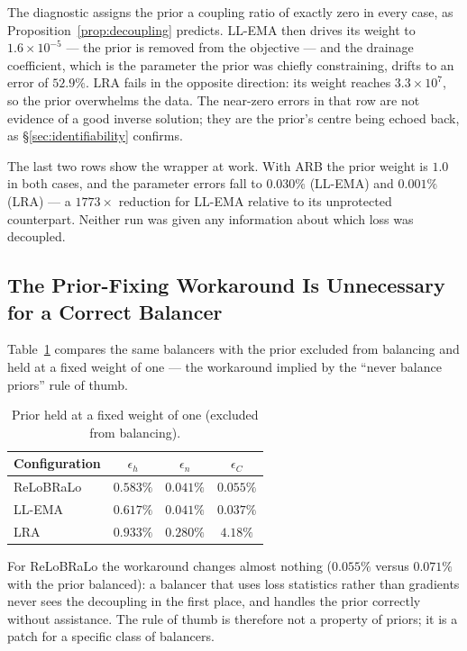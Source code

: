 \documentclass[a4paper,fleqn]{cas-sc}
\begin{document}
The diagnostic assigns the prior a coupling ratio of exactly zero in every
case, as Proposition~\ref{prop:decoupling} predicts. LL-EMA then drives its
weight to $1.6\times10^{-5}$ --- the prior is removed from the objective ---
and the drainage coefficient, which is the parameter the prior was chiefly
constraining, drifts to an error of $52.9\%$. LRA fails in the opposite
direction: its weight reaches $3.3\times10^7$, so the prior overwhelms the
data. The near-zero errors in that row are not evidence of a good inverse
solution; they are the prior's centre being echoed back, as
\S\ref{sec:identifiability} confirms.

The last two rows show the wrapper at work. With ARB the prior weight is
$1.0$ in both cases, and the parameter errors fall to $0.030\%$ (LL-EMA) and
$0.001\%$ (LRA) --- a $1773\times$ reduction for LL-EMA relative to its
unprotected counterpart. Neither run was given any information about which
loss was decoupled.

\subsection{The Prior-Fixing Workaround Is Unnecessary for a Correct Balancer}

Table~\ref{tab:fixed} compares the same balancers with the prior excluded from
balancing and held at a fixed weight of one --- the workaround implied by the
``never balance priors'' rule of thumb.

\begin{table}[t]
\centering
\caption{Prior held at a fixed weight of one (excluded from balancing).}
\label{tab:fixed}
\begin{tabular}{lccc}
\toprule
Configuration & $\epsilon_h$ & $\epsilon_n$ & $\epsilon_C$ \\
\midrule
ReLoBRaLo & $0.583\%$ & $0.041\%$ & $0.055\%$ \\
LL-EMA    & $0.617\%$ & $0.041\%$ & $0.037\%$ \\
LRA       & $0.933\%$ & $0.280\%$ & $4.18\%$ \\
\bottomrule
\end{tabular}
\end{table}

For ReLoBRaLo the workaround changes almost nothing ($0.055\%$ versus
$0.071\%$ with the prior balanced): a balancer that uses loss statistics
rather than gradients never sees the decoupling in the first place, and
handles the prior correctly without assistance. The rule of thumb is
therefore not a property of priors; it is a patch for a specific class of
balancers.
\end{document}
